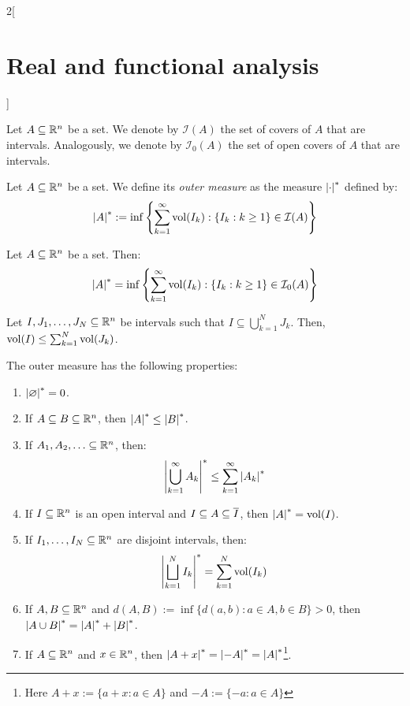 \documentclass[../../../main_math.tex]{subfiles}
\begin{document}
\begin{multicols}{2}[\section{Real and functional analysis}]
\begin{proposition}
  \end{proposition}
  \begin{definition}
    Let $A\subseteq\mathbb{R}^n$ be a set. We denote by $\mathcal{I}(A)$ the set of covers of $A$ that are intervals. Analogously, we denote by $\mathcal{I}_0(A)$ the set of open covers of $A$ that are intervals.
  \end{definition}
  \begin{definition}
    Let $A\subseteq\mathbb{R}^n$ be a set. We define its \emph{outer measure} as the measure $\om{}$ defined by:
    $$\om{A}:=\inf\left\{\sum_{k= 1}^\infty \vol(I_k):\{I_k:k\geq 1\}\in \mathcal{I}(A)\right\}$$
  \end{definition}
  \begin{proposition}
    Let $A\subseteq\mathbb{R}^n$ be a set. Then:
    $$\om{A}=\inf\left\{\sum_{k= 1}^\infty \vol(I_k):\{I_k:k\geq 1\}\in \mathcal{I}_0(A)\right\}$$
  \end{proposition}
  \begin{lemma}
    Let $I,J_1,\ldots,J_N\subseteq \mathbb{R}^n$ be intervals such that $I\subseteq \bigcup_{k=1}^N J_k$. Then, $\operatorname{vol}(I)\leq\sum_{k=1}^N \operatorname{vol}(J_k)$.
  \end{lemma}
  \begin{theorem}
    The outer measure has the following properties:
    \begin{enumerate}
      \item $\om{\varnothing}=0$.
      \item If $A\subseteq B\subseteq\mathbb{R}^n$, then $\om{A}\leq \om{B}$.
      \item If $A_1, A_2,\ldots \subseteq \mathbb{R}^n$, then: $$\om{\bigcup_{k=1}^\infty A_k}\leq \sum_{k=1}^\infty \om{A_k}$$
      \item If $I\subseteq \mathbb{R}^n$ is an open interval and $I\subseteq A\subseteq \overline{I}$, then $\om{A}=\vol(I)$.
      \item If $I_1,\ldots,I_N\subseteq \mathbb{R}^n$ are disjoint intervals, then: $$\displaystyle \om{\bigsqcup_{k=1}^N I_k}= \sum_{k=1}^N \vol(I_k)$$
      \item If $A,B\subseteq \mathbb{R}^n$ and $d(A,B):=\inf\{d(a,b):a\in A,b\in B\}>0$, then $\om{A\cup B}=\om{A}+\om{B}$.
      \item If $A\subseteq\mathbb{R}^n$ and $x\in\mathbb{R}^n$, then $\om{A+x}=\om{-A}=\om{A}$\footnote{Here $A+x:=\{a+x:a\in A\}$ and $-A:=\{-a:a\in A\}$}.
    \end{enumerate}
  \end{theorem}
  \begin{definition}

\end{definition}
\end{multicols}
\end{document}
